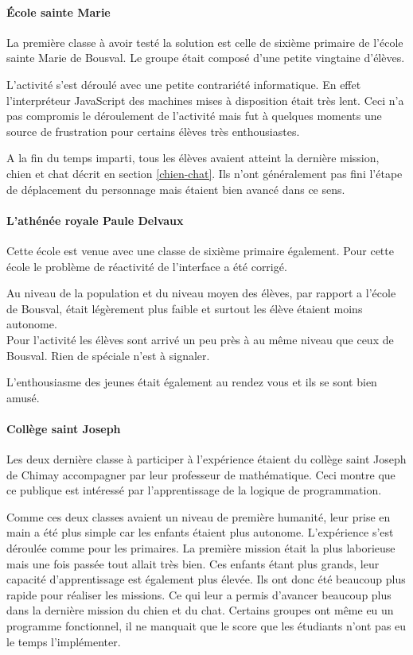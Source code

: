 \paragraph{École sainte Marie} 
La première classe à avoir testé la solution est celle de sixième primaire de l'école sainte Marie de Bousval. Le groupe était composé d'une petite vingtaine d'élèves.

L'activité s'est déroulé avec une petite contrariété informatique. En effet l'interpréteur JavaScript des machines mises à disposition était très lent. Ceci n'a pas compromis le déroulement de l'activité mais fut à quelques moments une source de frustration pour certains élèves très enthousiastes.

A la fin du temps imparti, tous les élèves avaient atteint la dernière mission, chien et chat décrit en section \ref{chien-chat}. Ils n'ont généralement pas fini l'étape de déplacement du personnage mais étaient bien avancé dans ce sens.

\paragraph{L'athénée royale Paule Delvaux}
Cette école est venue avec une classe de sixième primaire également. Pour cette école le problème de réactivité de l'interface a été corrigé.

Au niveau de la population et du niveau moyen des élèves, par rapport a l'école de Bousval, était légèrement plus faible et surtout les élève étaient moins autonome.\\

Pour l'activité les élèves sont arrivé un peu près à au même niveau que ceux de Bousval. Rien de spéciale n'est à signaler.

L'enthousiasme des jeunes était également au rendez vous et ils se sont bien amusé.

\paragraph{Collège saint Joseph}
Les deux dernière classe à participer à l'expérience étaient du collège saint Joseph de Chimay accompagner par leur professeur de mathématique. Ceci montre que ce publique est intéressé par l'apprentissage de la logique de programmation.

Comme ces deux classes avaient un niveau de première humanité, leur prise en main a été plus simple car les enfants étaient plus autonome. L'expérience s'est déroulée comme pour les primaires. La première mission était la plus laborieuse mais une fois passée tout allait très bien. Ces enfants étant plus grands, leur capacité d'apprentissage est également plus élevée. Ils ont donc été beaucoup plus rapide pour réaliser les missions. Ce qui leur a permis d'avancer beaucoup plus dans la dernière mission du chien et du chat. Certains groupes ont même eu un programme fonctionnel, il ne manquait que le score que les étudiants n'ont pas eu le temps l'implémenter.\\

